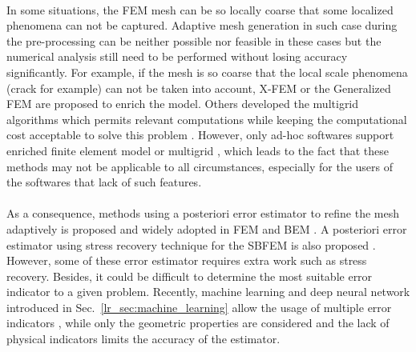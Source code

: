 \paragraph{}
In some situations, the FEM mesh can be so locally coarse that some localized phenomena can not be captured.
Adaptive mesh generation in such case during the pre-processing can be neither possible nor feasible in these cases but the numerical analysis still need to be performed without losing accuracy significantly. 
For example, if the mesh is so coarse that the local scale phenomena (crack for example) can not be taken into account, X-FEM \citep{Moes1999} or the Generalized FEM \citep{STROUBOULIS20014081,doi:10.1002/nme.4954} are proposed to enrich the model.
Others developed the multigrid algorithms which permits relevant computations while keeping the computational cost acceptable to solve this problem \citep{doi:10.1002/nme.2427, doi:10.1002/nme.3037}.
However, only ad-hoc softwares support enriched finite element model or multigrid \citep{Duval2018}, which leads to the fact that these methods may not be applicable to all circumstances, especially for the users of the softwares that lack of such features.

\paragraph{}
As a consequence, methods using a posteriori error estimator to refine the mesh adaptively is proposed and widely adopted in FEM \citep{Duval2018, doi:10.1002/gamm.201490020,PRUDHOMME20091887,BAUMAN2009799, doi:10.1002/nme.1620121010, doi:10.1002/nme.1620240618,Oden1989,doi:10.1002/nme.1620240206,doi:10.1002/nme.1620330702,doi:10.1002/nme.1620330703, BOROOMAND1999127, ZIENKIEWICZ1999111, Ainsworth1993} and BEM \citep{Zhao1998, Guiggiani1990, KAMIYA1992223, KITA199421,ZHAO1999793,KITA2000317}.
A posteriori error estimator using stress recovery technique for the SBFEM is also proposed \citep{NME:NME439}.
However, some of these error estimator requires extra work such as stress recovery.
Besides, it could be difficult to determine the most suitable error indicator to a given problem.
Recently, machine learning and deep neural network introduced in Sec.~\ref{lr_sec:machine_learning} allow the usage of multiple error indicators \citep{SaeedIqbal;Graham.F.Carey2005}, while only the geometric properties are considered and the lack of physical indicators limits the accuracy of the estimator.
